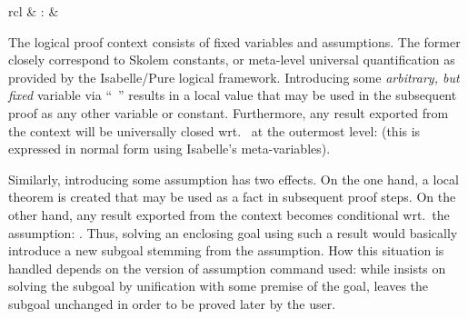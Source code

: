 \begin{isabellebody}
\begin{isamarkuptext}
\begin{matharray}{rcl}
    \hypertarget{command.def}{\hyperlink{command.def}{\mbox{}}} & : &  \\
  \end{matharray}

  The logical proof context consists of fixed variables and
  assumptions.  The former closely correspond to Skolem constants, or
  meta-level universal quantification as provided by the Isabelle/Pure
  logical framework.  Introducing some \emph{arbitrary, but fixed}
  variable via ``\hyperlink{command.fix}{\mbox{}}~'' results in a local value
  that may be used in the subsequent proof as any other variable or
  constant.  Furthermore, any result  exported from
  the context will be universally closed wrt.\  at the
  outermost level:  (this is expressed in normal
  form using Isabelle's meta-variables).

  Similarly, introducing some assumption  has two effects.
  On the one hand, a local theorem is created that may be used as a
  fact in subsequent proof steps.  On the other hand, any result
   exported from the context becomes conditional wrt.\
  the assumption: .  Thus, solving an enclosing goal
  using such a result would basically introduce a new subgoal stemming
  from the assumption.  How this situation is handled depends on the
  version of assumption command used: while \hyperlink{command.assume}{\mbox{}}
  insists on solving the subgoal by unification with some premise of
  the goal, \hyperlink{command.presume}{\mbox{}} leaves the subgoal unchanged in order
  to be proved later by the user.


\end{isamarkuptext}
\end{isabellebody}
